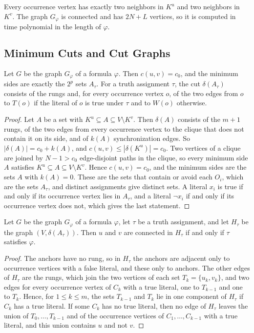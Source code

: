 Every occurrence vertex has exactly two neighbors in $K^u$ and two neighbors in $K^v$.
The graph $G_\varphi$ is connected and has $2N + L$ vertices, so it is computed in time polynomial in the length of $\varphi$.

\subsection{Minimum Cuts and Cut Graphs}
\label{sec:dt-correctness}

\begin{lemma}
\label{lem:dt-cuts}
Let $G$ be the graph $G_\varphi$ of a formula $\varphi$.
Then $c(u, v) = c_0$, and the minimum sides are exactly the $2^p$ sets $A_\tau$.
For a truth assignment $\tau$, the cut $\delta(A_\tau)$ consists of the rungs and, for every occurrence vertex $o$, of the two edges from $o$ to $T(o)$ if the literal of $o$ is true under $\tau$ and to $W(o)$ otherwise.
\end{lemma}

\begin{proof}
Let $A$ be a set with $K^u \subseteq A \subseteq V \setminus K^v$.
Then $\delta(A)$ consists of the $m + 1$ rungs, of the two edges from every occurrence vertex to the clique that does not contain it on its side, and of $k(A)$ synchronization edges.
So $|\delta(A)| = c_0 + k(A)$, and $c(u, v) \leq |\delta(K^u)| = c_0$.
Two vertices of a clique are joined by $N - 1 > c_0$ edge-disjoint paths in the clique, so every minimum side $A$ satisfies $K^u \subseteq A \subseteq V \setminus K^v$.
Hence $c(u, v) = c_0$, and the minimum sides are the sets $A$ with $k(A) = 0$.
These are the sets that contain or avoid each $O_i$, which are the sets $A_\tau$, and distinct assignments give distinct sets.
A literal $x_i$ is true if and only if its occurrence vertex lies in $A_\tau$, and a literal $\neg x_i$ if and only if its occurrence vertex does not, which gives the last statement.
\end{proof}

\begin{lemma}
\label{lem:dt-cut-graphs}
Let $G$ be the graph $G_\varphi$ of a formula $\varphi$, let $\tau$ be a truth assignment, and let $H_\tau$ be the graph $(V, \delta(A_\tau))$.
Then $u$ and $v$ are connected in $H_\tau$ if and only if $\tau$ satisfies $\varphi$.
\end{lemma}

\begin{proof}
The anchors have no rung, so in $H_\tau$ the anchors are adjacent only to occurrence vertices with a false literal, and these only to anchors.
The other edges of $H_\tau$ are the rungs, which join the two vertices of each set $T_k = \{u_k, v_k\}$, and two edges for every occurrence vertex of $C_k$ with a true literal, one to $T_{k-1}$ and one to $T_k$.
Hence, for $1 \leq k \leq m$, the sets $T_{k-1}$ and $T_k$ lie in one component of $H_\tau$ if $C_k$ has a true literal.
If some $C_k$ has no true literal, then no edge of $H_\tau$ leaves the union of $T_0, \dots, T_{k-1}$ and of the occurrence vertices of $C_1, \dots, C_{k-1}$ with a true literal, and this union contains $u$ and not $v$.
\end{proof}

